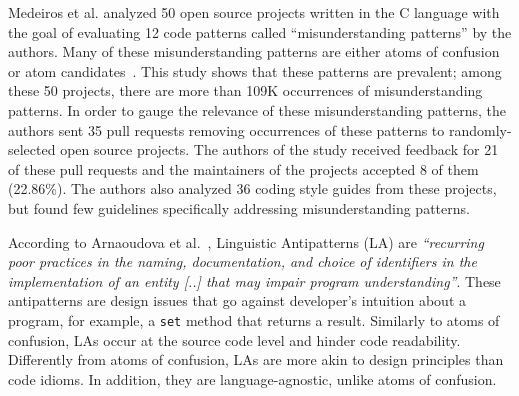 Medeiros et al. \cite{DBLP:journals/ese/MedeirosLAAKRG19} analyzed 50 open source projects written in the C language with the goal of evaluating 12 code patterns called ``misunderstanding patterns'' by the authors. Many of these misunderstanding patterns are either atoms of confusion or atom candidates~\cite{DBLP:conf/sigsoft/GopsteinIYDZYC17}. This study shows that these patterns are prevalent; among these 50 projects, there are more than 109K occurrences of misunderstanding patterns. 
In order to gauge the relevance of these misunderstanding patterns, the authors sent 35 pull requests removing occurrences of these patterns to randomly-selected open source projects. The authors of the study received feedback for 21 of these pull requests and the maintainers of the projects accepted 8 of them (22.86\%). The authors also analyzed 36 coding style guides from these projects, but found few guidelines specifically addressing misunderstanding patterns. 




According to Arnaoudova et al.~\cite{Arnaoudova:2016:LAW}, Linguistic Antipatterns (LA) are \textit{``recurring poor practices in the naming, documentation, and choice of identifiers in the implementation of an entity [..] that may impair program understanding''}. These antipatterns are design issues that go against developer's  intuition about a program, for example, a \texttt{set} method that returns a result. Similarly to atoms of confusion, LAs occur at the source code level and hinder code readability. Differently from atoms of confusion, LAs are more akin to design principles than code idioms. In addition, they are language-agnostic, unlike atoms of confusion.

